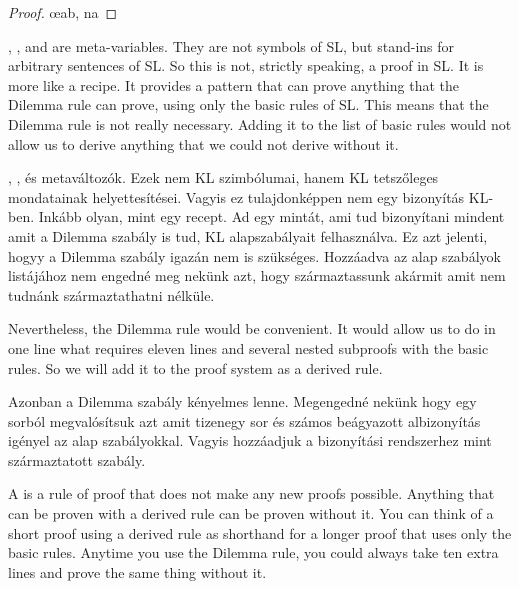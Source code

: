 \begin{proof}
	\open
		\open
		\close
		\open
		\close
		\oe{ab, na}
	\close
	 
\end{proof}



, , and  are meta-variables. They are not symbols of SL, but stand-ins for arbitrary sentences of SL. So this is not, strictly speaking, a proof in SL. It is more like a recipe. It provides a pattern that can prove anything that the Dilemma rule can prove, using only the basic rules of SL. This means that the Dilemma rule is not really necessary. Adding it to the list of basic rules would not allow us to derive anything that we could not derive without it.

, , és  metaváltozók. Ezek nem KL szimbólumai, hanem KL tetszőleges mondatainak helyettesítései. Vagyis ez tulajdonképpen nem egy bizonyítás KL-ben. Inkább olyan, mint egy recept. Ad egy mintát, ami tud bizonyítani mindent amit a Dilemma szabály is tud, KL alapszabályait felhasználva. Ez azt jelenti, hogyy a Dilemma szabály igazán nem is szükséges. Hozzáadva az alap szabályok listájához nem engedné meg nekünk azt, hogy származtassunk akármit amit nem tudnánk származtathatni nélküle.

Nevertheless, the Dilemma rule would be convenient. It would allow us to do in one line what requires eleven lines and several nested subproofs with the basic rules. So we will add it to the proof system as a derived rule.

Azonban a Dilemma szabály kényelmes lenne. Megengedné nekünk hogy egy sorból megvalósítsuk azt amit tizenegy sor és számos beágyazott albizonyítás igényel az alap szabályokkal. Vagyis hozzáadjuk a bizonyítási rendszerhez mint származtatott szabály.

A  is a rule of proof that does not make any new proofs possible. Anything that can be proven with a derived rule can be proven without it. You can think of a short proof using a derived rule as shorthand for a longer proof that uses only the basic rules. Anytime you use the Dilemma rule, you could always take ten extra lines and prove the same thing without it.

